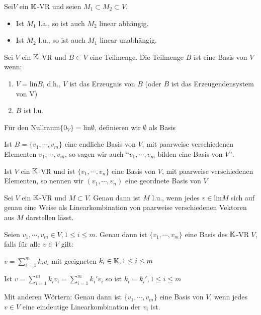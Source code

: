 \begin{remark}
Sei$V$ ein $\mathbb{K}$-VR und seien $M_1\subset M_2 \subset V$.
\begin{itemize}
    \item Ist $M_1$ l.a., so ist auch $M_2$ linear abhängig.
    \item Ist $M_2$ l.u., so ist auch $M_1$ linear unabhängig.
\end{itemize}
\end{remark}

\begin{definition}
Sei $V$ ein $\mathbb{K}$-VR und $B\subset V$ eine Teilmenge. Die Teilmenge $B$ ist eine Basis von $V$ wenn:
\begin{enumerate}
    \item  $V=$lin$B$, d.h., $V$ ist das Erzeugnis von $B$ (oder $B$ ist das Erzeugendensystem von V)
    \item $B$ ist l.u.
\end{enumerate}
Für den Nullraum$\{0_V\}=$lin$\emptyset$, definieren wir $\emptyset$ als Basis
\end{definition}

\begin{remark}
Ist $B = \{v_1,\dotsb, v_m\}$ eine endliche Basis von $V$, mit paarweise verschiedenen Elementen $v_1,\dotsb, v_m$, so sagen wir auch $\text{“}v_1,\dotsb, v_m$ bilden eine Basis von $V\text{”}$.
\end{remark}

\begin{definition}
Ist $V$ ein $\mathbb{K}$-VR und ist $\{v_1,\dotsb, v_n\}$ eine Basis von $V$, mit paarweise verschiedenen Elementen, so nennen wir $(v_1,\dotsb, v_n)$ eine geordnete Basis von $V$
\end{definition}

\begin{theorem}
Sei $V$ ein $\mathbb{K}$-VR und $M\subset V$. Genau dann ist $M$ l.u., wenn jedes $v \in $lin$ M $ sich auf genau eine Weise als Linearkombination von paarweise verschiedenen Vektoren aus $M$ darstellen lässt.
\end{theorem}

\begin{theorem}
Seien $v_1,\dotsb,v_m\in V, 1\leq i\leq m$. Genau dann ist $\{v_1,\dotsb,v_m\}$ eine Basis des $\mathbb{K}$-VR $V$, falls für alle $v\in V$ gilt:
\begin{item}
$v=\sum_{i=1}^m k_i v_i$ mit geeigneten $k_i\in\mathbb{K}, 1\leq i \leq m$
\item Ist $v=\sum_{i=1}^m k_i v_i=\sum_{i=1}^m k_i' v_i$ so ist $k_i=k_i', 1\leq i \leq m$
\end{item}
Mit anderen Wörtern: Genau dann ist $\{v_1,\dotsb,v_m\}$ eine Basis von $V$, wenn jedes $v\in V$ eine eindeutige Linearkombination der $v_i$ ist.
\end{theorem}

\newpage